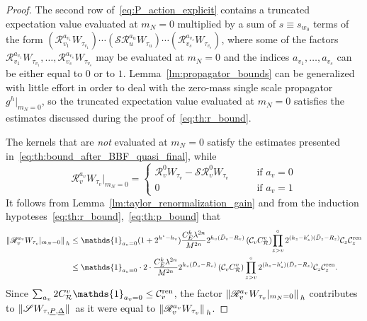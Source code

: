 \documentclass[a4paper, 11pt]{article}
\newcommand{\id}{\mathds{1}}								%
\newcommand{\sing}[2]{{#1}^{#2}}							%
\newcommand{\ren}{\mathcal{R}}								%
\newcommand{\kren}{\mathscr{R}}								%
\theoremstyle{thm}
\begin{document}
\begin{proof}
The second row of~\eqref{eq:P_action_explicit} contains a truncated expectation value evaluated at $m_N = 0$ multiplied by a sum of $s \equiv s_{w_0}$ terms of the form $(\kren_{v_1}^{a_{v_1}} W_{\tau_{v_1}}) \cdots (\mathscr{S} \kren_u^{a_u} W_{\tau_u}) \cdots (\kren_{v_s}^{a_{v_s}} W_{\tau_{v_s}})$, where some of the factors $\kren_{v_1}^{a_{v_1}} W_{\tau_{v_1}}, \dots, \kren_{v_s}^{a_{v_s}} W_{\tau_{v_s}}$ may be evaluated at $m_N = 0$ and the indices $a_{v_1}, \dots, a_{v_s}$ can be either equal to $0$ or to $1$. Lemma~\ref{lm:propagator_bounds} can be generalized with little effort in order to deal with the zero-mass single scale propagator $\sing{g}{h} \vert_{m_N = 0}$, so the truncated expectation value evaluated at $m_N = 0$ satisfies the estimates discussed during the proof of~\eqref{eq:th:r_bound}. 

The kernels that are \emph{not} evaluated at $m_N = 0$ satisfy the estimates presented in~\eqref{eq:th:bound_after_BBF_quasi_final}, while
\begin{equation}
\kren_v^{a_v} W_{\tau_v} \vert_{m_N = 0} =
\begin{cases}
\kren_v^0 W_{\tau_v} - \mathscr{S} \kren_v^0 W_{\tau_v} & \qquad \text{if } a_v = 0 \\
0														& \qquad \text{if } a_v = 1
\end{cases}
\end{equation}
It follows from Lemma~\ref{lm:taylor_renormalization_gain} and from the induction hypoteses~\eqref{eq:th:r_bound},~\eqref{eq:th:p_bound} that
\begin{align*}
\norm*{\kren_v^{a_v} W_{\tau_v} \vert_{m_N = 0}}_h 
& \le \id_{a_v = 0} (1 + 2^{h^\star - h_v}) \frac{C_E^k \lambda^{2n}}{M^{2n}} 2^{h_v(\bar{D}_v - R_v)} \, (\mathcal{C}_v C^v_\ren) \! \prod_{z > v}^\circ 2^{(h_z - h'_z)(\bar{D}_z - R_z)} \mathcal{C}_z \mathcal{C}^{\textup{ren}}_z \\
& \le \id_{a_v = 0} \cdot 2 \cdot \frac{C_E^k \lambda^{2n}}{M^{2n}} 2^{h_v(\bar{D}_v - R_v)} \, (\mathcal{C}_v C^v_\ren) \prod_{z > v}^\circ 2^{(h_z - h'_z)(\bar{D}_z - R_z)}\mathcal{C}_z \mathcal{C}^{\textup{ren}}_z.
\end{align*}
Since $\sum_{a_v} 2C_\ren^v \id_{a_v = 0} \le \mathcal{C}^\textup{ren}_v$, the factor $\norm*{\kren^{a_v}_v W_{\tau_v} \vert_{m_N = 0}}_h$ contributes to $\norm*{\mathscr{S} W_{\tau, \underline{P}, \underline{\Delta}}}$ as it were equal to $\norm*{\kren^{a_v}_v W_{\tau_v}}_h$.


\end{proof}
\end{document}
